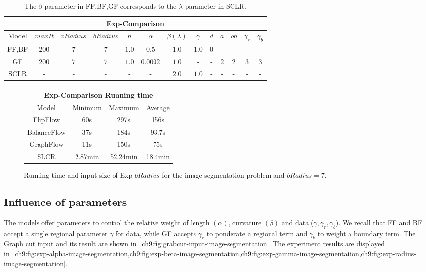 \begin{table}
\small
\centering
\begin{tabular}{|c|c|c|c|c|c|c|c|c|c|c|c|c|}
\hline
\multicolumn{13}{|c|}{Exp-Comparison}\\
\hline
Model & $maxIt$ & $vRadius$ & $bRadius$ & $h$ & $\alpha$ & $\beta (\lambda)$  & $\gamma$ & $d$ & $a$ & $ob$ & $\gamma_r$ & $\gamma_b$ \\
\hline
FF,BF & $200$ & $7$ & $7$ & $1.0$ & $0.5$ & $1.0$ & $1.0$ & $0$ & - & - & - & -\\
\hline
GF & $200$ & $7$ & $7$ & $1.0$ & $0.0002$ & $1.0$ & - & - & $2$ & $2$ & $3$ & $3$\\
\hline
SCLR & - & - & - & - & - & $2.0$ & $1.0$ & - & - & - & - & -\\
\hline
\end{tabular}
\caption{ The $\beta$ parameter in FF,BF,GF corresponds to the $\lambda$ parameter in SCLR.}
\label{ch9:tab:image-segmentation-comparison-summary}
\end{table}

\begin{figure}
\center
\captionsetup{type=table}
\begin{tabular}{|c|c|c|c|}
\hline
\multicolumn{4}{|c|}{Exp-Comparison Running time}\\
\hline
Model & Minimum & Maximum & Average \\
\hline
FlipFlow & 60s & 297s & 156s\\
BalanceFlow & 37s & 184s & 93.7s\\
GraphFlow & 11s & 150s & 75s\\
SLCR & 2.87min & 52.24min & 18.4min\\
\hline
\end{tabular}
\caption{Running time and input size of Exp-$bRadius$ for the image segmentation problem and $bRadius=7$.}
\label{ch9:tab:rtime-image-segmentation-general} 
\end{figure}

\subsection{Influence of parameters}
The models offer parameters to control the relative weight of length $(\alpha)$, curvature $(\beta)$ and data ($\gamma,\gamma _r, \gamma _b$). We recall that FF and BF accept a single regional parameter $\gamma$ for data, while GF accepts $\gamma _r$ to ponderate a regional term and $\gamma _b$ to weight a boundary term. The Graph cut input and its result are shown in~\cref{ch9:fig:grabcut-input-image-segmentation}. The experiment results are displayed in~\cref{ch9:fig:exp-alpha-image-segmentation,ch9:fig:exp-beta-image-segmentation,ch9:fig:exp-gamma-image-segmentation,ch9:fig:exp-radius-image-segmentation}. 

